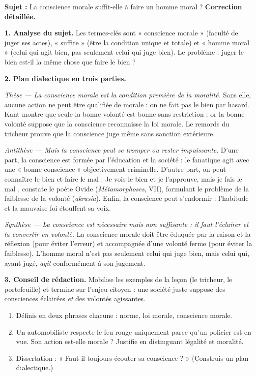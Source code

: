 \documentclass[11pt]{article}
\begin{document}
\begin{exoresolu}
\textbf{Sujet :} La conscience morale suffit-elle à faire un homme moral ?
\tcblower
\textbf{Correction détaillée.}

\textbf{1. Analyse du sujet.} Les termes-clés sont « conscience morale » (faculté de juger ses actes), « suffire » (être la condition unique et totale) et « homme moral » (celui qui agit bien, pas seulement celui qui juge bien). Le problème : juger le bien est-il la même chose que faire le bien ?

\textbf{2. Plan dialectique en trois parties.}

\emph{Thèse — La conscience morale est la condition première de la moralité.} Sans elle, aucune action ne peut être qualifiée de morale : on ne fait pas le bien par hasard. Kant montre que seule la bonne volonté est bonne sans restriction ; or la bonne volonté suppose que la conscience reconnaisse la loi morale. Le remords du tricheur prouve que la conscience juge même sans sanction extérieure.

\emph{Antithèse — Mais la conscience peut se tromper ou rester impuissante.} D'une part, la conscience est formée par l'éducation et la société : le fanatique agit avec une « bonne conscience » objectivement criminelle. D'autre part, on peut connaître le bien et faire le mal : \guillemotleft Je vois le bien et je l'approuve, mais je fais le mal \guillemotright, constate le poète Ovide (\emph{Métamorphoses}, VII), formulant le problème de la faiblesse de la volonté (\emph{akrasia}). Enfin, la conscience peut s'endormir : l'habitude et la mauvaise foi étouffent sa voix.

\emph{Synthèse — La conscience est nécessaire mais non suffisante : il faut l'éclairer et la convertir en volonté.} La conscience morale doit être éduquée par la raison et la réflexion (pour éviter l'erreur) et accompagnée d'une volonté ferme (pour éviter la faiblesse). L'homme moral n'est pas seulement celui qui juge bien, mais celui qui, ayant jugé, \emph{agit} conformément à son jugement.

\textbf{3. Conseil de rédaction.} Mobilise les exemples de la leçon (le tricheur, le portefeuille) et termine sur l'enjeu citoyen : une société juste suppose des consciences éclairées \emph{et} des volontés agissantes.
\end{exoresolu}

\begin{exercice}
\begin{enumerate}
  \item Définis en deux phrases chacune : norme, loi morale, conscience morale.
  \item Un automobiliste respecte le feu rouge uniquement parce qu'un policier est en vue. Son action est-elle morale ? Justifie en distinguant légalité et moralité.
  \item Dissertation : « Faut-il toujours écouter sa conscience ? » (Construis un plan dialectique.)
\end{enumerate}
\end{exercice}
\end{document}
